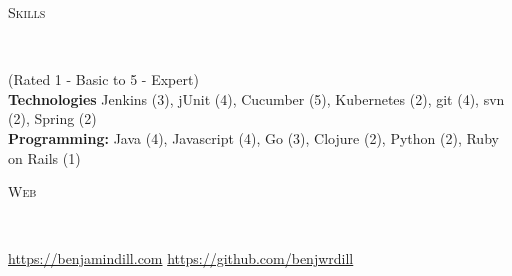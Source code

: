 \documentclass[9pt]{article}
\newenvironment{changemargin}[2]{%
  \begin{list}{}{%
      \setlength{\topsep}{0pt}%
      \setlength{\leftmargin}{#1}%
      \setlength{\rightmargin}{#2}%
      \setlength{\listparindent}{\parindent}%
      \setlength{\itemindent}{\parindent}%
      \setlength{\parsep}{\parskip}%
    }%
  \item[]}{\end{list}
}
\newcommand{\lineover}{
  \begin{changemargin}{-0.05in}{-0.05in}
    \vspace*{-8pt}
    \hrulefill \\
    \vspace*{-2pt}
  \end{changemargin}
}
\newcommand{\header}[1]{
  \begin{changemargin}{-0.5in}{-0.5in}
    \scshape{#1}\\
    \lineover
  \end{changemargin}
}
\newenvironment{body} {
  \vspace*{-16pt}
  \begin{changemargin}{-0.25in}{-0.5in}
  }	
  {\end{changemargin}
}
\begin{document}
\header{Skills}

\begin{body}
  \vspace{17pt}
  {(Rated 1 - Basic to 5 - Expert)} \\
  \textbf{Technologies} Jenkins (3), jUnit (4), Cucumber (5), Kubernetes (2), git (4), svn (2), Spring (2) \\
  \textbf{Programming:} Java (4), Javascript (4), Go (3), Clojure (2), Python (2), Ruby on Rails (1) \\
\end{body}

\smallskip

\header{Web}

\begin{body}
  \vspace{17pt}
  \url{https://benjamindill.com} \hfill{} \url{https://github.com/benjwrdill} \\
\end{body}
\end{document}
